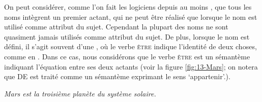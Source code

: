 On peut considérer, comme l’on fait les logiciens depuis au moins \citet{frege1892uber}, que tous les noms intègrent un premier actant, qui ne peut être réalisé que lorsque le nom est utilisé comme attribut du sujet. Cependant la plupart des noms ne sont quasiment jamais utilisés comme attribut du sujet. De plus, lorsque le nom est défini, il s’agit souvent d’une , où le verbe \textsc{être} indique l’identité de deux choses, comme en . Dans ce cas, nous considérons que le verbe \textsc{être} est un sémantème indiquant l'équation entre ses deux actants (voir la figure \ref{fig:13-Mars}; on notera que DE est traité comme un sémantème exprimant le sens ‘appartenir’.).

\ea\label{ex:13-Mars} \textit{Mars est la troisième planète du système solaire.}\z

